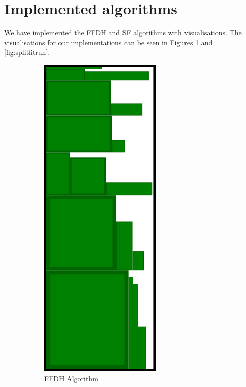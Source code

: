 \documentclass{article}
\begin{document}
\section{Implemented algorithms}
We have implemented the FFDH and SF algorithms with visualisations. The visualisations for our implementations can be seen in Figures \ref{fig:ffdhrun} and \ref{fig:splitfitrun}.\\
\begin{figure}[ht]
\centering
\begin{subfigure}{.35\textwidth}
  \centering
  \includegraphics[width=.5\linewidth]{FFDHrun.png}
  \caption{FFDH Algorithm}
  \label{fig:ffdhrun}
\end{subfigure}%
\begin{subfigure}{.35\textwidth}
  \centering

\end{subfigure}
\end{figure}
\end{document}
